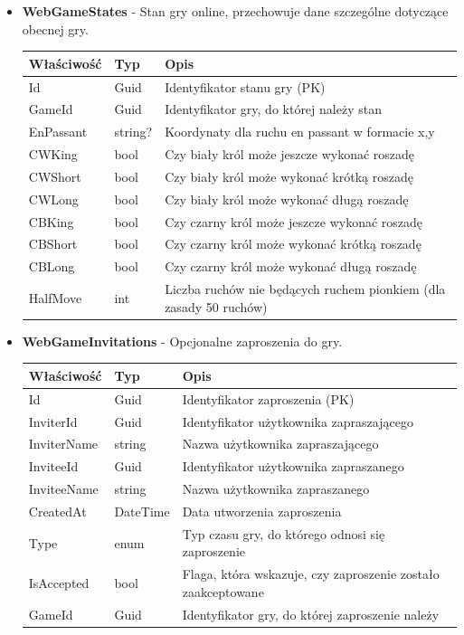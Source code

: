 \documentclass[12pt,a4paper]{article}
\begin{document}
\begin{itemize}
    \item \textbf{WebGameStates} - Stan gry online, przechowuje dane szczególne dotyczące obecnej gry.
    \begin{longtable}{|m{4cm}|m{2cm}|m{8cm}|}
        \hline
        \textbf{Właściwość} & \textbf{Typ} & \textbf{Opis} \\ \hline
        \endhead
        \hline
        Id & Guid & Identyfikator stanu gry (PK) \\ \hline
        GameId & Guid & Identyfikator gry, do której należy stan \\ \hline
        EnPassant & string? & Koordynaty dla ruchu en passant w formacie x,y \\ \hline
        CWKing & bool & Czy biały król może jeszcze wykonać roszadę \\ \hline
        CWShort & bool & Czy biały król może wykonać krótką roszadę \\ \hline
        CWLong & bool & Czy biały król może wykonać długą roszadę \\ \hline
        CBKing & bool & Czy czarny król może jeszcze wykonać roszadę \\ \hline
        CBShort & bool & Czy czarny król może wykonać krótką roszadę \\ \hline
        CBLong & bool & Czy czarny król może wykonać długą roszadę \\ \hline
        HalfMove & int & Liczba ruchów nie będących ruchem pionkiem (dla zasady 50 ruchów) \\ \hline
    \end{longtable}
        

    \item \textbf{WebGameInvitations} - Opcjonalne zaproszenia do gry.
    \begin{longtable}{|m{4cm}|m{2cm}|m{8cm}|}
        \hline
        \textbf{Właściwość} & \textbf{Typ} & \textbf{Opis} \\ \hline
        \endhead
        \hline
        Id & Guid & Identyfikator zaproszenia (PK) \\ \hline
        InviterId & Guid & Identyfikator użytkownika zapraszającego \\ \hline
        InviterName & string & Nazwa użytkownika zapraszającego \\ \hline
        InviteeId & Guid & Identyfikator użytkownika zapraszanego \\ \hline
        InviteeName & string & Nazwa użytkownika zapraszanego \\ \hline
        CreatedAt & DateTime & Data utworzenia zaproszenia \\ \hline
        Type & enum & Typ czasu gry, do którego odnosi się zaproszenie \\ \hline
        IsAccepted & bool & Flaga, która wskazuje, czy zaproszenie zostało zaakceptowane \\ \hline
        GameId & Guid & Identyfikator gry, do której zaproszenie należy \\ \hline
    \end{longtable}
        


\end{itemize}
\end{document}
